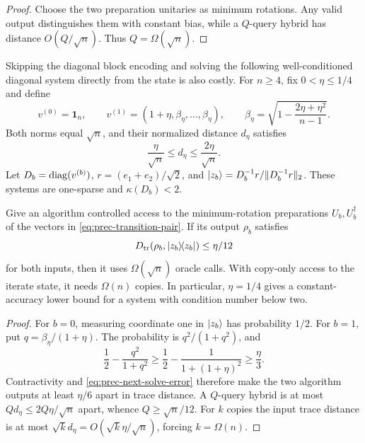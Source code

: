 \begin{proof}
Choose the two preparation unitaries as minimum rotations.  Any valid output
distinguishes them with constant bias, while a $Q$-query hybrid has distance
$O(Q/\sqrt n)$.  Thus $Q=\Omega(\sqrt n)$.
\end{proof}

Skipping the diagonal block encoding and solving the following
well-conditioned diagonal system directly from the state is also costly.  For
$n\geq4$, fix $0<\eta\leq1/4$ and define
\begin{equation}
 v^{(0)}=\mathbf1_n,\qquad
 v^{(1)}=(1+\eta,\beta_\eta,\ldots,\beta_\eta),\qquad
 \beta_\eta=\sqrt{1-\frac{2\eta+\eta^2}{n-1}}.           \label{eq:prec-transition-pair}
\end{equation}
Both norms equal $\sqrt n$, and their normalized distance $d_\eta$ satisfies
\begin{equation}
 \frac\eta{\sqrt n}\leq d_\eta\leq\frac{2\eta}{\sqrt n}. \label{eq:prec-transition-distance}
\end{equation}
Let $D_b=\operatorname{diag}(v^{(b)})$,
$r=(e_1+e_2)/\sqrt2$, and
$\lvert z_b\rangle=D_b^{-1}r/\lVert D_b^{-1}r\rVert_2$.  These systems are one-sparse and
$\kappa(D_b)<2$.

\begin{theorem}
\label{thm:prec-state-next-solve}
Give an algorithm controlled access to the minimum-rotation preparations
$U_b,U_b^\dagger$ of the vectors in \eqref{eq:prec-transition-pair}.  If its
output $\rho_b$ satisfies
\begin{equation}
 D_{\mathrm{tr}}(\rho_b,\lvert z_b\rangle\!\langle z_b\rvert)\leq\eta/12            \label{eq:prec-next-solve-error}
\end{equation}
for both inputs, then it uses $\Omega(\sqrt n)$ oracle calls.  With
copy-only access to the iterate state, it needs $\Omega(n)$ copies.  In
particular, $\eta=1/4$ gives a constant-accuracy lower bound for a system
with condition number below two.
\end{theorem}

\begin{proof}
For $b=0$, measuring coordinate one in $\lvert z_b\rangle$ has probability $1/2$.
For $b=1$, put $q=\beta_\eta/(1+\eta)$.  The probability is
$q^2/(1+q^2)$, and
\begin{equation}
 \frac12-\frac{q^2}{1+q^2}
 \geq\frac12-\frac1{1+(1+\eta)^2}\geq\frac\eta3.         \label{eq:prec-solution-separation}
\end{equation}
Contractivity and \eqref{eq:prec-next-solve-error} therefore make the two
algorithm outputs at least $\eta/6$ apart in trace distance.  A $Q$-query
hybrid is at most $Qd_\eta\leq2Q\eta/\sqrt n$ apart, whence
$Q\geq\sqrt n/12$.  For $k$ copies the input trace distance is at most
$\sqrt{k}d_\eta=O(\sqrt{k}\eta/\sqrt n)$, forcing $k=\Omega(n)$.
\end{proof}

